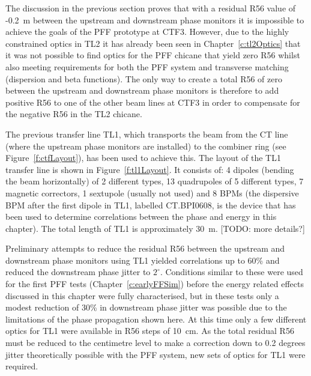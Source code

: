 
The discussion in the previous section proves that with a residual R56 value of -0.2~m between the upstream and downstream phase monitors it is impossible to achieve the goals of the PFF prototype at CTF3. However, due to the highly constrained optics in TL2 it has already been seen in Chapter~\ref{c:tl2Optics} that it was not possible to find optics for the PFF chicane that yield zero R56 whilst also meeting requirements for both the PFF system and transverse matching (dispersion and beta functions). The only way to create a total R56 of zero between the upstream and downstream phase monitors is therefore to add positive R56 to one of the other beam lines at CTF3 in order to compensate for the negative R56 in the TL2 chicane. 

The previous transfer line TL1, which transports the beam from the CT line (where the upstream phase monitors are installed) to the combiner ring (see Figure~\ref{f:ctfLayout}), has been used to achieve this. The layout of the TL1 transfer line is shown in Figure~\ref{f:tl1Layout}. It consists of: 4 dipoles (bending the beam horizontally) of 2 different types, 13 quadrupoles of 5 different types, 7 magnetic correctors, 1 sextupole (usually not used) and 8 BPMs (the dispersive BPM after the first dipole in TL1, labelled CT.BPI0608, is the device that has been used to determine correlations between the phase and energy in this chapter). The total length of TL1 is approximately 30~m.
[TODO: more details?]

Preliminary attempts to reduce the residual R56 between the upstream and downstream phase monitors using TL1 yielded correlations up to 60\% and reduced the downstream phase jitter to \(2^\circ\). Conditions similar to these were used for the first PFF tests (Chapter~\ref{c:earlyFFSim}) before the energy related effects discussed in this chapter were fully characterised, but in these tests only a modest reduction of 30\% in downstream phase jitter was possible due to the limitations of the phase propagation shown here. At this time only a few different optics for TL1 were available in R56 steps of 10~cm. As the total residual R56 must be reduced to the centimetre level to make a correction down to 0.2 degrees jitter theoretically possible with the PFF system, new sets of optics for TL1 were required.

